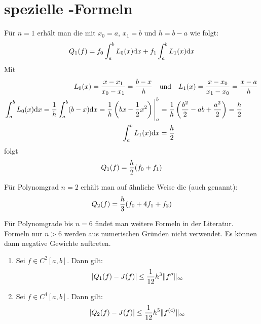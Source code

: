 \section{spezielle -Formeln}

Für $n=1$ erhält man die  mit $x_0=a$, $x_1=b$ und $h=b-a$ wie folgt:
\begin{align}
	Q_1(f)=f_0\int_a^b L_0(x)\mathrm{d} x+f_1\int_a^b L_1(x)\mathrm{d} x\notag
\end{align}
Mit 
\begin{align}
	L_0(x)=\frac{x-x_1}{x_0-x_1}=\frac{b-x}{h}\quad&\text{und}\quad L_1(x)=\frac{x-x_0}{x_1-x_0} = \frac{x-a}{h} \notag \\
	\int_a^b L_0(x)\mathrm{d} x=\frac{1}{h}\int_a^b (b-x)\mathrm{d} x=\frac{1}{h}\left( bx-\frac{1}{2}x^2\right)\Bigg|_a^b&=\frac{1}{h} \left( \frac{b^2}{2}-ab+\frac{a^2}{2}\right) =\frac{h}{2}\notag \\
	\int_a^b L_1(x)\mathrm{d} x&=\frac{h}{2}\notag
\end{align}
folgt
\begin{align}
	Q_1(f)=\frac{h}{2}(f_0+f_1)\notag
\end{align}

Für Polynomgrad $n=2$ erhält man auf ähnliche Weise die  (auch  genannt):
\begin{align}
	Q_2(f)=\frac{h}{3}(f_0+4f_1+f_2)\notag
\end{align}

Für Polynomgrade bis $n=6$ findet man weitere Formeln in der Literatur. Formeln nur $n>6$ werden aus numerischen Gründen nicht verwendet. Es können dann negative Gewichte auftreten.

\begin{proposition}
	\begin{enumerate}[label=(\alph*)]
		\item Sei $f\in C^2[a,b]$. Dann gilt:
		\begin{align}
			\vert Q_1(f)-J(f)\vert \le \frac{1}{12}h^3\Vert f''\Vert_\infty\notag
		\end{align}
		\item Sei $f\in C^4[a,b]$. Dann gilt:
		\begin{align}
			\vert Q_2(f)-J(f)\vert \le \frac{1}{12}h^5\Vert f^{(4)}\Vert_\infty\notag
		\end{align}
	\end{enumerate}
\end{proposition}
